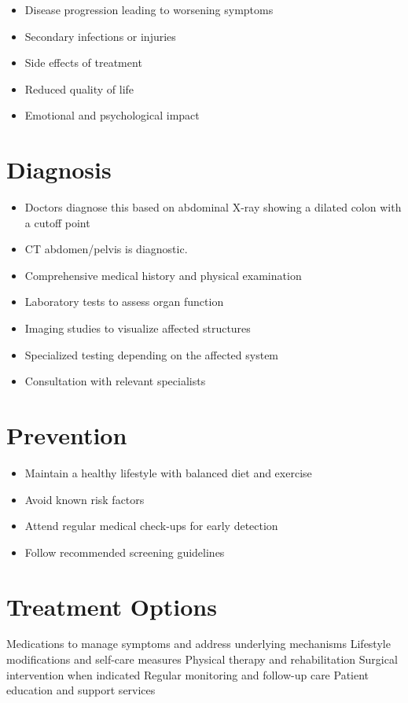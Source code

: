 \begin{itemize}[noitemsep]
  \item Disease progression leading to worsening symptoms
  \item Secondary infections or injuries
  \item Side effects of treatment
  \item Reduced quality of life
  \item Emotional and psychological impact
\end{itemize}
\section{Diagnosis}
\begin{itemize}[noitemsep]
  \item Doctors diagnose this based on abdominal X-ray showing a dilated colon with a cutoff point
  \item CT abdomen/pelvis is diagnostic.
  \item Comprehensive medical history and physical examination
  \item Laboratory tests to assess organ function
  \item Imaging studies to visualize affected structures
  \item Specialized testing depending on the affected system
  \item Consultation with relevant specialists
\end{itemize}
\section{Prevention}
\begin{itemize}[noitemsep]
  \item Maintain a healthy lifestyle with balanced diet and exercise
  \item Avoid known risk factors
  \item Attend regular medical check-ups for early detection
  \item Follow recommended screening guidelines
\end{itemize}
\section{Treatment Options}
Medications to manage symptoms and address underlying mechanisms Lifestyle modifications and self-care measures Physical therapy and rehabilitation Surgical intervention when indicated Regular monitoring and follow-up care Patient education and support services

